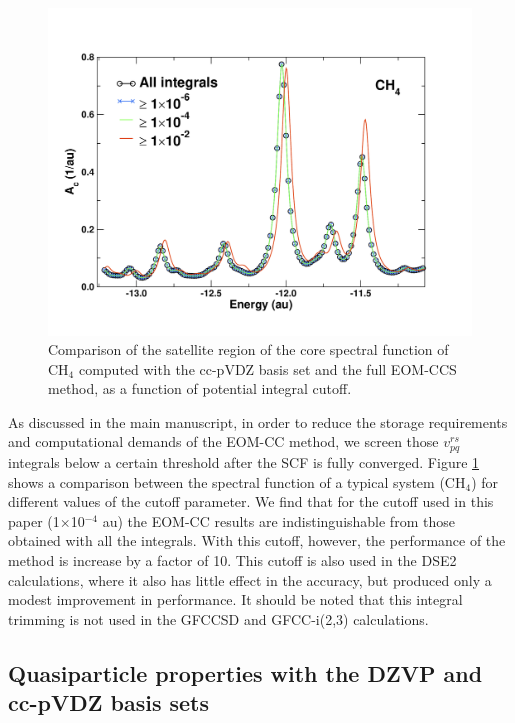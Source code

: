 \documentclass[aps,prb,preprint,groupaddress,floatfix]{revtex4}
\begin{document}
\begin{figure}[t]
\includegraphics[scale=0.5,clip,
trim=1.1cm 1.2cm 3.0cm 1.8cm]{Fig03-SI.pdf}
\caption{\label{fig:cutoff}
Comparison of the satellite region of the core spectral function of CH$_4$ computed with the cc-pVDZ basis set and the full EOM-CCS method, as a function of potential integral cutoff.
}
\end{figure}
As discussed in the main manuscript, in order to reduce the storage requirements and computational demands of the EOM-CC method, we screen those $v_{pq}^{rs}$ integrals below a certain threshold after the SCF is fully converged. Figure \ref{fig:cutoff} shows a comparison between the spectral function of a typical system (CH$_4$) for different values of the cutoff parameter. We find that for the cutoff used in this paper (1$\times$10$^{-4}$ au) the EOM-CC results are indistinguishable from those obtained with all the integrals. With this cutoff, however, the performance of the method is increase by a factor of 10. This cutoff is also used in the DSE2 calculations, where it also has little effect in the accuracy, but produced only a modest improvement in performance. It should be noted that this integral trimming is not used in the GFCCSD and GFCC-i(2,3) calculations.

\subsection{Quasiparticle properties with the DZVP and cc-pVDZ basis sets}
\end{document}
